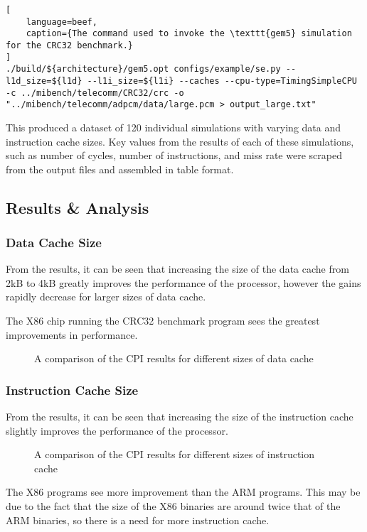 \begin{lstlisting}[
    language=beef,
    caption={The command used to invoke the \texttt{gem5} simulation for the CRC32 benchmark.}
]
./build/${architecture}/gem5.opt configs/example/se.py --l1d_size=${l1d} --l1i_size=${l1i} --caches --cpu-type=TimingSimpleCPU -c ../mibench/telecomm/CRC32/crc -o "../mibench/telecomm/adpcm/data/large.pcm > output_large.txt"
\end{lstlisting}



This produced a dataset of 120 individual simulations with varying data and instruction
cache sizes.
Key values from the results of each of these simulations, such as number of cycles, 
number of instructions, and miss rate were scraped from the output files and assembled 
in table format.

\subsection{Results \& Analysis}

\subsubsection{Data Cache Size}

From the results, it can be seen that increasing the size of the data cache from 2kB to 
4kB greatly improves the performance of the processor, however the gains rapidly 
decrease for larger sizes of data cache.

The X86 chip running the CRC32 benchmark program sees the greatest improvements in 
performance.

\begin{figure}[H]
    \centering
    
    \caption{A comparison of the CPI results for different sizes of data cache}
    \label{fig:parta-l1d}
\end{figure}

\subsubsection{Instruction Cache Size}

From the results, it can be seen that increasing the size of the instruction cache 
slightly improves the performance of the processor.

\begin{figure}[H]
    \centering
    
    \caption{A comparison of the CPI results for different sizes of instruction cache}
    \label{fig:parta-l1i}
\end{figure}

The X86 programs see more improvement than the ARM programs.
This may be due to the fact that the size of the X86 binaries are around twice that of 
the ARM binaries, so there is a need for more instruction cache.
